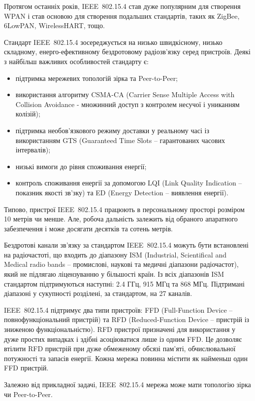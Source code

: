 \documentclass[a4paper,ukrainian,utf8,nocolumnsxix,floatsection]{eskdtext}
\newcommand{\iee}[0]{IEEE~802.15.4\xspace}
\begin{document}
Протягом останніх років, \iee став дуже популярним для створення WPAN і став основою для створення подальших стандартів, таких як ZigBee, 6LowPAN, WirelessHART, тощо. 

Стандарт \iee зосереджується на низько швидкісному, низько складному, енерго-ефективному бездротовому радіозв’язку серед пристроїв. Деякі з найбільш важливих особливостей стандарту є:
\begin{itemize}
	\item підтримка мережевих топологій зірка та Peer-to-Peer;
	\item використання алгоритму CSMA-CA (Carrier Sense Multiple Access with Collision Avoidance - множинний доступ з контролем несучої і униканням колізій);
	\item підтримка необов’язкового режиму доставки у реальному часі із використанням GTS (Guaranteed Time Slots – гарантованих  часових інтервалів);
	\item низькі вимоги до рівня споживання енергії;
	\item контроль споживання енергії за допомогою LQI (Link Quality Indication – показник якості зв’зку) та ED (Energy Detection – виявлення енергії).
\end{itemize}

Типово, пристрої \iee працюють в персональному просторі розміром 10 метрів чи менше. Але, робоча дальність залежить від обраного апаратного забезпечення і може досягати десятків та сотень метрів.

Бездротові канали зв’язку за стандартом \iee можуть бути встановлені на радіочастоті, що входить до діапазону ISM (Industrial, Scientifical and Medical radio bands – промислові, наукові та медичні діапазони радіочастот), який не підлягаю ліцензуванню у більшості країн. Із всіх діапазонів ISM стандартом підтримуються наступні: 2.4 ГГц, 915 МГц та 868 МГц. Підтримані діапазоні у сукупності розділені, за стандартом, на 27 каналів. 

\iee підтримує два типи пристроїв: FFD (Full-Function Device – повнофункціональний пристрій) та RFD (Reduced-Function Device – пристрій із зниженою функціональністю). RFD пристрої призначені для використання у дуже простих випадках і здібні асоціюватися лише із одним FFD. Це дозволяє втілити RFD пристрій при дуже обмеженому обсязі пам’яті, обчислювальної потужності та запасів енергії. Кожна мережа повинна містити як найменьш один FFD пристрій. 

Залежно від прикладної задачі, \iee мережа може мати топологію зірка чи  Peer-to-Peer. 
\end{document}
